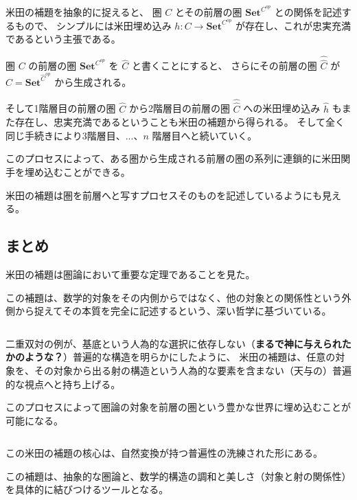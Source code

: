 \documentclass[uplatex,a4j,12pt,dvipdfmx]{jsarticle}
\begin{document}
米田の補題を抽象的に捉えると、
圏 $C$ とその前層の圏 $\mathbf{Set}^{C^{op}}$ との関係を記述するもので、
シンプルには米田埋め込み $h: C \to \mathbf{Set}^{C^{op}}$ が存在し、これが忠実充満であるという主張である。

圏 $C$ の前層の圏 $\mathbf{Set}^{C^{op}}$ を $\hat{C}$ と書くことにすると、
さらにその前層の圏 $\hat{\hat{C}}$ が $\hat{C} = \mathbf{Set}^{\hat{C}^{op}}$ から生成される。

そして1階層目の前層の圏 $\hat{C}$ から2階層目の前層の圏 $\hat{\hat{C}}$ への米田埋め込み $\hat{h}$ もまた存在し、忠実充満であるということも米田の補題から得られる。
そして全く同じ手続きにより3階層目、...、$n$ 階層目へと続いていく。

このプロセスによって、ある圏から生成される前層の圏の系列に連鎖的に米田関手を埋め込むことができる。

米田の補題は圏を前層へと写すプロセスそのものを記述しているようにも見える。


\subsection{まとめ}

米田の補題は圏論において重要な定理であることを見た。

この補題は、数学的対象をその内側からではなく、他の対象との関係性という外側から捉えてその本質を完全に記述するという、深い哲学に基づいている。

${}$

二重双対の例が、基底という人為的な選択に依存しない（\textbf{まるで神に与えられたかのような？}）普遍的な構造を明らかにしたように、
米田の補題は、任意の対象を、その対象から出る射の構造という人為的な要素を含まない（天与の）普遍的な視点へと持ち上げる。


このプロセスによって圏論の対象を前層の圏という豊かな世界に埋め込むことが可能になる。

${}$

この米田の補題の核心は、自然変換が持つ普遍性の洗練された形にある。

この補題は、抽象的な圏論と、数学的構造の調和と美しさ（対象と射の関係性）を具体的に結びつけるツールとなる。
\end{document}
